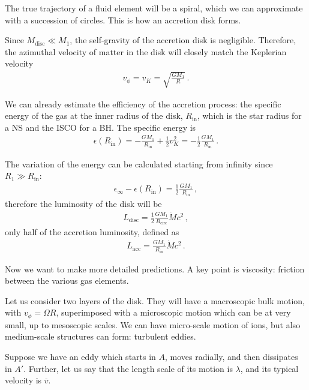 \documentclass[main.tex]{subfiles}
\begin{document}
The true trajectory of a fluid element will be a spiral, which we can approximate with a succession of circles.
This is how an accretion disk forms. 

Since \(M _{\text{disc}} \ll M_1 \), the self-gravity of the accretion disk is negligible. Therefore, the azimuthal velocity of matter in the disk will closely match the Keplerian velocity 
%
\begin{align}
v_{\phi } = v_K = \sqrt{ \frac{GM_1}{R}}
\,.
\end{align}

We can already estimate the efficiency of the accretion process: the specific energy of the gas at the inner radius of the disk, \(R _{\text{in}}\), which is the star radius for a NS and the ISCO for a BH. 
The specific energy is 
%
\begin{align}
\epsilon (R _{\text{in}}) = - \frac{GM_1 }{R _{\text{in}}} 
+ \frac{1}{2} v_K^2 = - \frac{1}{2} \frac{GM_1 }{R _{\text{in}}}
\,.
\end{align}

The variation of the energy can be calculated starting from infinity since \(R_1 \gg R _{\text{in}}\):
%
\begin{align}
\epsilon_{\infty } - \epsilon (R _{\text{in}}) = \frac{1}{2} \frac{GM_1}{R _{\text{in}}}
\,,
\end{align}
%
therefore the luminosity of the disk will be 
%
\begin{align}
L _{\text{disc}}= \frac{1}{2} \frac{GM_1 }{R _{\text{circ}}} \dot{M} c^2
\,,
\end{align}
%
only half of the accretion luminosity, defined as
%
\begin{align}
L _{\text{acc}} = \frac{GM_1 }{R _{\text{in}}} \dot{M} c^2
\,.
\end{align}

Now we want to make more detailed predictions.
A key point is viscosity: friction between the various gas elements.

Let us consider two layers of the disk.
They will have a macroscopic bulk motion, with \(v_\phi = \Omega R\),
superimposed with a microscopic motion which can be at very small, up to mesoscopic scales. 
We can have micro-scale motion of ions, but also
medium-scale structures can form: turbulent eddies.

Suppose we have an eddy which starts in \(A\), moves radially, and then dissipates in \(A'\).
Further, let us say that the length scale of its motion is \(\lambda \), and its typical velocity is \(\overline{v}\). 
\end{document}

